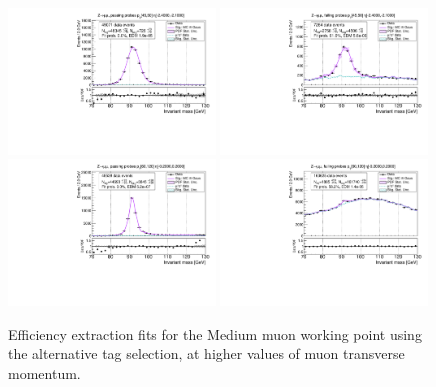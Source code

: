 \begin{figure}
\centering
\includegraphics[width=0.49\textwidth]{figures/Zmm_AltTag_pass_ptBin7_etaBin0.pdf}
\includegraphics[width=0.49\textwidth]{figures/Zmm_AltTag_fail_ptBin7_etaBin0.pdf}
\includegraphics[width=0.49\textwidth]{figures/Zmm_AltTag_pass_ptBin10_etaBin6.pdf}
\includegraphics[width=0.49\textwidth]{figures/Zmm_AltTag_fail_ptBin10_etaBin6.pdf}
\caption{Efficiency extraction fits for the Medium muon working point using the alternative tag selection, at higher values of muon transverse momentum.}
\label{fig:ZmmAltAltTagFits2}
\end{figure}

